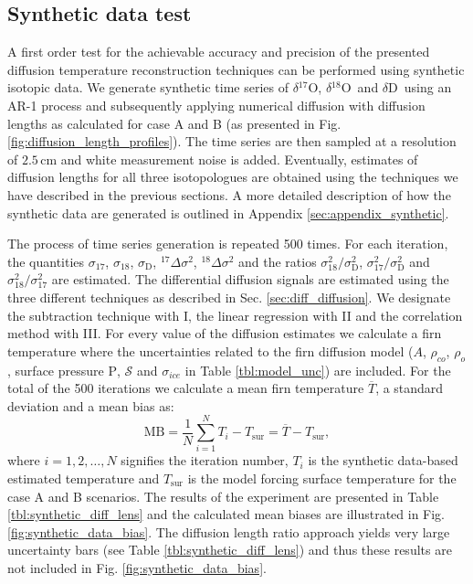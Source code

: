 \documentclass[11pt, draftcls, onecolumn]{IEEEtran} %
\numberwithin{equation}{section}
\numberwithin{table}{section}
\numberwithin{figure}{section}
\newcommand{\delOx}{$\delta{}^{18}\mathrm{O}$}
\newcommand{\delOxb}{$\delta{}^{17}\mathrm{O}$}
\newcommand{\delD}{$\delta\mathrm{D}$}
\begin{document}
\subsection{Synthetic data test} \label{sec:synthetic_results}
A first order test for the achievable accuracy and precision of the presented diffusion temperature reconstruction
techniques can be performed using synthetic isotopic data. 
We generate synthetic time series of 
\delOxb, \delOx~and \delD~using an AR-1 process and subsequently applying numerical diffusion with diffusion 
lengths as calculated for case A and B (as presented in Fig. \ref{fig:diffusion_length_profiles}).
The time series are then sampled at a resolution of $2.5\,\mathrm{cm}$ and white measurement noise is added. Eventually,
estimates of diffusion lengths for all three isotopologues are obtained using the techniques we have described 
in the previous sections. 
A more detailed description of how the synthetic data are generated is outlined in Appendix \ref{sec:appendix_synthetic}.



The process of time series generation is repeated 500 times. 
For each iteration, the quantities $\sigma_{17}$, $\sigma_{18}$,
$\sigma_\mathrm{D}$, ${}^{17}\Delta\sigma^2$, ${}^{18}\Delta\sigma^2$ and 
the ratios $\sigma^2_{18}/\sigma^2_{\mathrm{D}}$,
$\sigma^2_{17}/\sigma^2_{\mathrm{D}}$ and $\sigma^2_{18}/\sigma^2_{17}$ are estimated. 
The differential diffusion signals are estimated 
using the three different techniques as described in Sec. \ref{sec:diff_diffusion}.
We designate the subtraction technique with
I, the linear regression with II and the correlation method with III. 
For every value of the diffusion estimates we calculate a firn temperature where
the uncertainties related to the firn diffusion model ($A$, $\rho_{co}$, $\rho_o$, surface pressure $\mathrm{P}$, $\mathcal{S}$ and $\sigma_{ice}$ in Table \ref{tbl:model_unc}) are included. 
For the total of the 500 iterations we calculate a mean firn temperature $\overline{T}$, 
a standard deviation and a mean bias as: 
\begin{equation}
\text{MB} = \frac{1}{N} \sum_{i = 1}^{N} T_i - T_{\text{sur}} = \overline{T} - T_{\text{sur}},
\end{equation}
where $i = 1,2,\dots,N$ signifies the iteration number, $T_i$ is the synthetic 
data-based estimated temperature and $T_{\text{sur}}$ is the model forcing  
surface temperature for the case A and B scenarios.
The results of the experiment are presented in Table \ref{tbl:synthetic_diff_lens} and the calculated 
mean biases are illustrated in Fig. \ref{fig:synthetic_data_bias}.
The diffusion length ratio approach yields very large uncertainty bars (see Table \ref{tbl:synthetic_diff_lens}) and thus these results are not 
included in Fig. \ref{fig:synthetic_data_bias}. 
\end{document}
